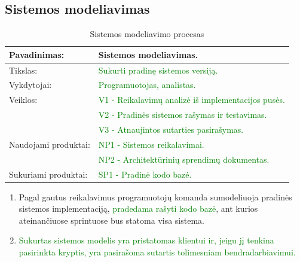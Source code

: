 \documentclass{VUMIFPSkursinis}
\begin{document}
	\newpage

	\subsection{Sistemos modeliavimas}
	\begin{center}
		\begin{table}[ht]
			\caption{Sistemos modeliavimo procesas}
			\begin{tabular}{ | l | l | }
				\hline
				Pavadinimas:         & Sistemos modeliavimas.                                                \\ \hline
				Tikslas:             & \textcolor{green}{Sukurti pradinę sistemos versiją.}                  \\ \hline
				Vykdytojai:          & \textcolor{green}{Programuotojas, analistas.}                         \\ \hline
				Veiklos:             & \textcolor{green}{V1 - Reikalavimų analizė iš implementacijos pusės.} \\
				                     & \textcolor{green}{V2 - Pradinės sistemos rašymas ir testavimas.}      \\
				                     & \textcolor{green}{V3 - Atnaujintos sutarties pasirašymas.}            \\ \hline
				Naudojami produktai: & \textcolor{green}{NP1 - Sistemos reikalavimai.}                       \\
				                     & \textcolor{green}{NP2 - Architektūrinių sprendimų dokumentas.}        \\ \hline
				Sukuriami produktai: & \textcolor{green}{SP1 - Pradinė kodo bazė.}                           \\ \hline
			\end{tabular}
		\end{table}
	\end{center}

	\begin{enumerate}
		\item Pagal gautus reikalavimus programuotojų komanda sumodeliuoja pradinės sistemos implementaciją, \textcolor{green}{pradedama rašyti kodo bazė}, ant kurios ateinančiuose sprintuose bus statoma visa sistema.
		\item \textcolor{green}{Sukurtas sistemos modelis yra pristatomas klientui ir, jeigu jį tenkina pasirinkta kryptis, yra pasirašoma sutartis tolimesniam bendradarbiavimui.}
	\end{enumerate}
\end{document}
